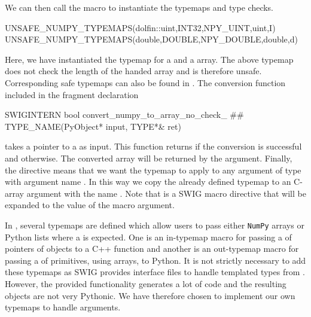We can then call the macro to instantiate the typemaps and type checks.
\begin{swigcode}
UNSAFE_NUMPY_TYPEMAPS(dolfin::uint,INT32,NPY_UINT,uint,I)
UNSAFE_NUMPY_TYPEMAPS(double,DOUBLE,NPY_DOUBLE,double,d)
\end{swigcode}
Here, we have instantiated the typemap for a  and a
 array. The above typemap does not check the length of the
handed \numpy array and is therefore unsafe. Corresponding safe
typemaps can also be found in . The conversion
function included in the fragment declaration
\begin{swigcode}
SWIGINTERN bool convert_numpy_to_array_no_check_ ## TYPE_NAME(PyObject* input, TYPE*& ret)
\end{swigcode}
takes a pointer to a  as input. This function returns
 if the conversion is successful and 
otherwise. The converted array will be returned by the  argument.  Finally, the 
directive means that we want the typemap to apply to any argument of
type  with argument name . In this way we copy
the already defined typemap to an C-array argument with the name
.  Note that  is a SWIG macro
directive that will be expanded to the value of the 
macro argument.

In , several typemaps are defined which
allow users to pass either \texttt{NumPy} arrays or Python lists where
a  is expected. One is an in-typemap macro for
passing a  of pointers of \dolfin objects to a C++
function and another is an out-typemap macro for passing a
 of primitives, using \numpy arrays, to Python. It is
not strictly necessary to add these typemaps as SWIG provides
interface files to handle templated types from
. However, the provided 
functionality generates a lot of code and the resulting objects are
not very Pythonic. We have therefore chosen to implement our own
typemaps to handle  arguments.

